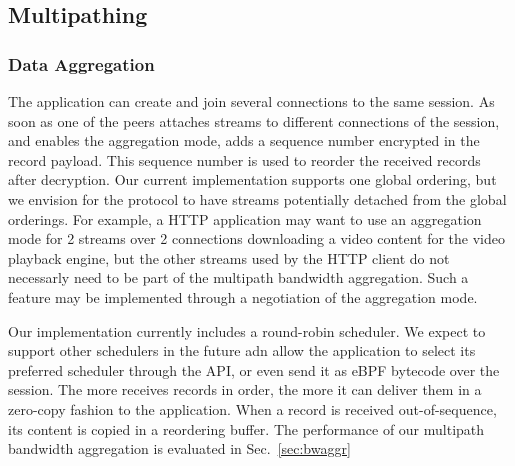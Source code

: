 


\subsection{Multipathing}

\subsubsection{Data Aggregation}
The application can create and join several \tcp connections to
the same \tcpls session. As soon as one of the peers attaches streams to
different \tcp connections of the session, and enables the aggregation mode,
\tcpls adds a sequence number encrypted in the \tls record payload. This
sequence number is used to reorder the received records after decryption. Our
current implementation supports one global ordering, but
we envision for the \tcpls protocol to have streams potentially detached from
the global orderings. For example, a HTTP application may want to use an
aggregation mode for 2 streams over 2 \tcp connections downloading a video
content for the video playback engine, but the other streams used by the HTTP
client do not necessarly need to be part of the multipath bandwidth aggregation.
Such a feature may be implemented through a negotiation of the aggregation
mode.

Our implementation currently includes a round-robin scheduler. We expect to
support other schedulers in the future adn allow the application to select its preferred scheduler through the API, or even send it as eBPF bytecode over the session. The more \tcpls receives records in order, the more it can deliver them in a zero-copy fashion to the application. When a record is received out-of-sequence, its content is copied in a reordering buffer. The performance of our multipath bandwidth aggregation is evaluated in Sec.~\ref{sec:bwaggr}

